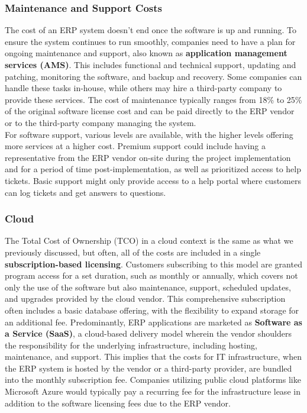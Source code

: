 \subsubsection{Maintenance and Support Costs}
The cost of an ERP system doesn't end once the software is up and running. To ensure the system continues to run smoothly, companies need to have a plan for ongoing maintenance and support, also known as \textbf{application management services (AMS)}. This includes functional and technical support, updating and patching, monitoring the software, and backup and recovery. Some companies can handle these tasks in-house, while others may hire a third-party company to provide these services. The cost of maintenance typically ranges from 18\% to 25\% of the original software license cost and can be paid directly to the ERP vendor or to the third-party company managing the system. \\
For software support, various levels are available, with the higher levels offering more services at a higher cost. Premium support could include having a representative from the ERP vendor on-site during the project implementation and for a period of time post-implementation, as well as prioritized access to help tickets. Basic support might only provide access to a help portal where customers can log tickets and get answers to questions.

\subsubsection{Cloud}
The Total Cost of Ownership (TCO) in a cloud context is the same as what we previously discussed,
but often, all of the costs are included in a single \textbf{subscription-based licensing}.
Customers subscribing to this model are granted program access for a set duration, such as monthly
or annually, which covers not only the use of the software but also maintenance, support, scheduled
updates, and upgrades provided by the cloud vendor. This comprehensive subscription often includes a
basic database offering, with the flexibility to expand storage for an additional fee.
\newline\newline
Predominantly, ERP applications are marketed as \textbf{Software as a Service (SaaS)}, a cloud-based
delivery model wherein the vendor shoulders the responsibility for the underlying infrastructure,
including hosting, maintenance, and support. This implies that the costs for IT infrastructure, when
the ERP system is hosted by the vendor or a third-party provider, are bundled into the monthly
subscription fee. Companies utilizing public cloud platforms like Microsoft Azure would typically
pay a recurring fee for the infrastructure lease in addition to the software licensing fees due to
the ERP vendor.

